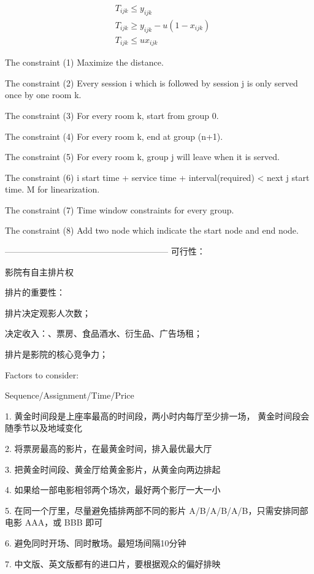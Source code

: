 
$$
\begin{aligned}
& T_{ijk} \leq y_{ijk} \\
& T_{ijk} \geq y_{ijk} - u(1-x_{ijk})    \\
& T_{ijk} \leq u x_{ijk}
\end{aligned}$$

The constraint (1) Maximize the distance.

The constraint (2) Every session i which is followed by session j is only served once by one room k.

The constraint (3) For every room k, start from group 0.

The constraint (4) For every room k, end at group (n+1).

The constraint (5) For every room k, group j will leave when it is served.

The constraint (6) i start time + service time + interval(required) < next j start time. M for linearization.

The constraint (7) Time window constraints for every group. 

The constraint (8) Add two node which indicate the start node and end node.


---------------------------------------------------------
可行性：

影院有自主排片权

排片的重要性：

排片决定观影人次数；

决定收入：、票房、食品酒水、衍生品、广告场租；

排片是影院的核心竞争力；

Factors to consider:

Sequence/Assignment/Time/Price

1. 黄金时间段是上座率最高的时间段，两小时内每厅至少排一场， 黄金时间段会随季节以及地域变化

2. 将票房最高的影片，在最黄金时间，排入最优最大厅

3. 把黄金时间段、黄金厅给黄金影片，从黄金向两边排起

4. 如果给一部电影相邻两个场次，最好两个影厅一大一小

5. 在同一个厅里，尽量避免插排两部不同的影片 A/B/A/B/A/B，只需安排同部电影 AAA，或 BBB 即可

6. 避免同时开场、同时散场。最短场间隔10分钟

7. 中文版、英文版都有的进口片，要根据观众的偏好排映

